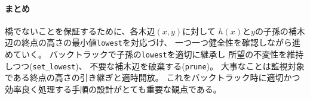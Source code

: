 \paragraph{まとめ}
橋でないことを保証するために、各木辺$(x, y)$に対して
$h(x)$と$y$の子孫の補木辺の終点の高さの最小値{\tt lowest}を対応づけ、
一つ一つ健全性を確認しながら進めていく。
バックトラックで子孫の{\tt lowest}を適切に継承し
所望の不変性を維持しつつ({\tt set\_lowest})、
不要な補木辺を破棄する({\tt prune})。
大事なことは監視対象である終点の高さの引き継ぎと適時開放。
これをバックトラック時に適切かつ効率良く処理する手順の設計がとても重要な観点である。

